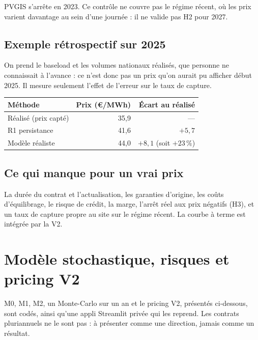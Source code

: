 \documentclass[11pt,a4paper]{article}
\begin{document}
\begin{attention}
PVGIS s'arrête en 2023. Ce contrôle ne couvre pas le régime récent, où les prix varient davantage au sein d'une journée : il ne valide pas H2 pour 2027.
\end{attention}

\subsection{Exemple rétrospectif sur 2025}

On prend le baseload et les volumes nationaux réalisés, que personne ne connaissait à l'avance : ce n'est donc pas un prix qu'on aurait pu afficher début 2025. Il mesure seulement l'effet de l'erreur sur le taux de capture.

\begin{center}
\begin{tabular}{lrr}
\toprule
\textbf{Méthode} & \textbf{Prix (€/MWh)} & \textbf{Écart au réalisé} \\
\midrule
Réalisé (prix capté) & 35,9 & --- \\
R1 persistance & 41,6 & $+5{,}7$ \\
Modèle réaliste & 44,0 & $+8{,}1$ (soit $+23\,\%$) \\
\bottomrule
\end{tabular}
\end{center}

\subsection{Ce qui manque pour un vrai prix}

La durée du contrat et l'actualisation, les garanties d'origine, les coûts d'équilibrage, le risque de crédit, la marge, l'arrêt réel aux prix négatifs (H3), et un taux de capture propre au site sur le régime récent. La courbe à terme est intégrée par la V2.

\section{Modèle stochastique, risques et pricing V2}

\begin{attention}
M0, M1, M2, un Monte-Carlo sur un an et le pricing V2, présentés ci-dessous, sont codés, ainsi qu'une appli Streamlit privée qui les reprend. Les contrats pluriannuels ne le sont pas : à présenter comme une direction, jamais comme un résultat.
\end{attention}
\end{document}
